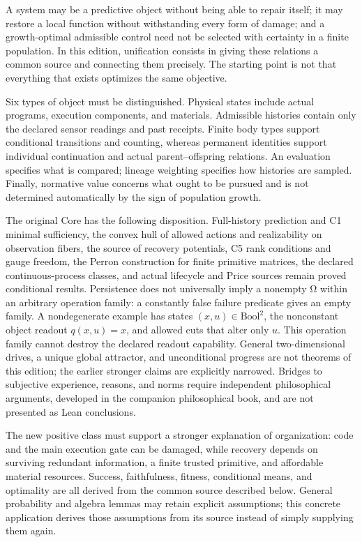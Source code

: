 \documentclass[
  english,
  11pt,
  oneside]{book}
\newcounter{none} %
\begin{document}
A system may be a predictive object without being able to repair itself; it may restore a local function without withstanding every form of damage; and a growth-optimal admissible control need not be selected with certainty in a finite population. In this edition, unification consists in giving these relations a common source and connecting them precisely. The starting point is not that everything that exists optimizes the same objective.

Six types of object must be distinguished. Physical states include actual programs, execution components, and materials. Admissible histories contain only the declared sensor readings and past receipts. Finite body types support conditional transitions and counting, whereas permanent identities support individual continuation and actual parent--offspring relations. An evaluation specifies what is compared; lineage weighting specifies how histories are sampled. Finally, normative value concerns what ought to be pursued and is not determined automatically by the sign of population growth.

The original Core has the following disposition. Full-history prediction and C1 minimal sufficiency, the convex hull of allowed actions and realizability on observation fibers, the source of recovery potentials, C5 rank conditions and gauge freedom, the Perron construction for finite primitive matrices, the declared continuous-process classes, and actual lifecycle and Price sources remain proved conditional results. Persistence does not universally imply a nonempty Ω within an arbitrary operation family: a constantly false failure predicate gives an empty family. A nondegenerate example has states \((x,u)\in\mathrm{Bool}^2\), the nonconstant object readout \(q(x,u)=x\), and allowed cuts that alter only \(u\). This operation family cannot destroy the declared readout capability. General two-dimensional drives, a unique global attractor, and unconditional progress are not theorems of this edition; the earlier stronger claims are explicitly narrowed. Bridges to subjective experience, reasons, and norms require independent philosophical arguments, developed in the companion philosophical book, and are not presented as Lean conclusions.

The new positive class must support a stronger explanation of organization: code and the main execution gate can be damaged, while recovery depends on surviving redundant information, a finite trusted primitive, and affordable material resources. Success, faithfulness, fitness, conditional means, and optimality are all derived from the common source described below. General probability and algebra lemmas may retain explicit assumptions; this concrete application derives those assumptions from its source instead of simply supplying them again.
\end{document}
